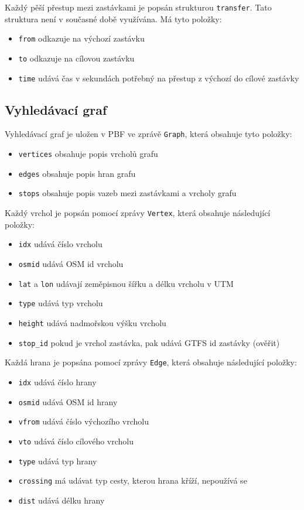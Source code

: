 Každý pěší přestup mezi zastávkami je popsán strukturou {\tt transfer}. Tato
struktura není v současné době využívána. Má tyto položky:
\begin{itemize}
	\item {\tt from} odkazuje na výchozí zastávku
	\item {\tt to} odkazuje na cílovou zastávku
	\item {\tt time} udává čas v sekundách potřebný na přestup z výchozí do
	cílové zastávky
\end{itemize}
\subsection{Vyhledávací graf}
Vyhledávací graf je uložen v PBF ve zprávě {\tt Graph}, která obsahuje tyto
položky:
\begin{itemize}
	\item {\tt vertices} obsahuje popis vrcholů grafu
	\item {\tt edges} obsahuje popis hran grafu
	\item {\tt stops} obsahuje popis vazeb mezi zastávkami a vrcholy grafu 
\end{itemize} 
Každý vrchol je popsán pomocí zprávy {\tt Vertex}, která obsahuje následující
položky:
\begin{itemize}
	\item {\tt idx} udává číslo vrcholu
	\item {\tt osmid} udává OSM id vrcholu
	\item {\tt lat} a {\tt lon} udávají zeměpisnou šířku a délku vrcholu v
	UTM
	\item {\tt type} udává typ vrcholu
	\item {\tt height} udává nadmořskou výšku vrcholu
	\item {\tt stop\_id} pokud je vrchol zastávka, pak udává GTFS id
	zastávky (\TODO ověřit) 
\end{itemize} 
Každá hrana je popsána pomocí zprávy {\tt Edge}, která obsahuje následující
položky: 
\begin{itemize}
	\item {\tt idx} udává číslo hrany
	\item {\tt osmid} udává OSM id hrany
	\item {\tt vfrom} udává číslo výchozího vrcholu 
	\item {\tt vto} udává číslo cílového vrcholu
	\item {\tt type} udává typ hrany
	\item {\tt crossing} má udávat typ cesty, kterou hrana kříží, nepoužívá
	se
	\item {\tt dist} udává délku hrany
\end{itemize} 
